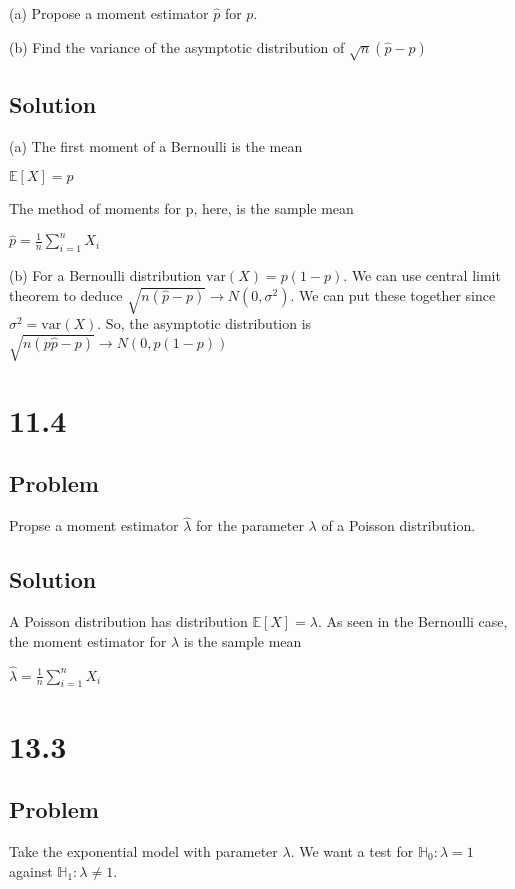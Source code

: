\documentclass[10pt, a4paper]{article}
\newcommand{\EE}{\mathbb E}
\begin{document}
      (a) Propose a moment estimator $\hat p$ for $p$.

      (b) Find the variance of the asymptotic distribution of $\sqrt{n}(\hat p-p)$

    \subsection*{Solution}
      (a) The first moment of a Bernoulli is the mean
      \begin{center}
        $\mathbb{E}[X]=p$
      \end{center}
      The method of moments for p, here, is the sample mean
      \begin{center}
        $\boxed{\hat p = \frac{1}{n}\sum_{i=1}^nX_i}$
      \end{center}
      (b) For a Bernoulli distribution $\text{var}(X)=p(1-p)$. We can use central limit theorem to deduce $\sqrt{n(\hat p-p)}\rightarrow N(0,\sigma^2)$. We can put these together since $\sigma^2 = \text{var}(X)$. So, the asymptotic distribution is $\sqrt{n(p\hat p-p)} \rightarrow N(0,p(1-p))$ 
  \section*{11.4}
    \subsection*{Problem}
      Propse a moment estimator $\hat\lambda$ for the parameter $\lambda$ of a Poisson distribution.  
    \subsection*{Solution}
      A Poisson distribution has distribution $\EE[X]=\lambda$. As seen in the Bernoulli case, the moment estimator for $\lambda$ is the sample mean
      \begin{center}
        $\boxed{\hat\lambda = \frac{1}{n}\sum_{i=1}^n X_i}$
      \end{center}
  \section*{13.3}
    \subsection*{Problem}
      Take the exponential model with parameter $\lambda$. We want a test for $\mathbb{H}_0:\lambda=1$ against $\mathbb{H}_1:\lambda\ne1$.
\end{document}
